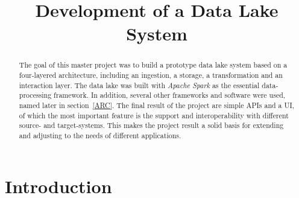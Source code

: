 \documentclass[conference]{IEEEtran}
\begin{document}
\title{Development of a Data Lake System}

\author{
\and
{}
\and
{}
}

\maketitle


\begin{abstract}
The goal of this master project was to build a prototype data lake system based on a four-layered 
architecture, including an ingestion, a storage, a transformation and an interaction layer.
The data lake was built with \textit{Apache Spark} as the essential data-processing framework. In 
addition, several other frameworks and software were used, named later in section~\ref{ARC}.
The final result of the project are simple APIs and  a UI, of which the most important feature is
the support and interoperability with different source- and target-systems. 
This makes the project result a solid basis for extending and adjusting to the needs of different 
applications.
\end{abstract}

\section{Introduction}\label{INT}
\end{document}
